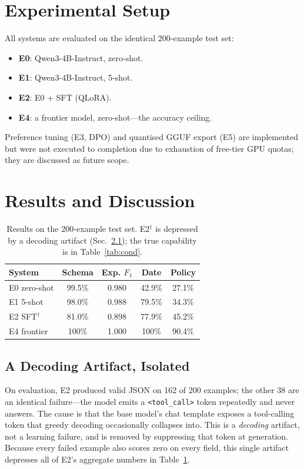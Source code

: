 \documentclass[conference]{IEEEtran}
\begin{document}
\section{Experimental Setup}
All systems are evaluated on the identical 200-example test set:
\begin{itemize}
  \item \textbf{E0}: Qwen3-4B-Instruct, zero-shot.
  \item \textbf{E1}: Qwen3-4B-Instruct, 5-shot.
  \item \textbf{E2}: E0 $+$ SFT (QLoRA).
  \item \textbf{E4}: a frontier model, zero-shot---the accuracy ceiling.
\end{itemize}
Preference tuning (E3, DPO) and quantised GGUF export (E5) are implemented but
were not executed to completion due to exhaustion of free-tier GPU quotas; they
are discussed as future scope.

\section{Results and Discussion}

\begin{table}[t]
\caption{Results on the 200-example test set. E2$^{\dagger}$ is depressed by a
decoding artifact (Sec.~\ref{sec:artifact}); the true capability is in
Table~\ref{tab:cond}.}
\label{tab:main}
\centering
\small
\begin{tabular}{lcccc}
\toprule
System & Schema & Exp. $F_1$ & Date & Policy \\
\midrule
E0 zero-shot        & 99.5\% & 0.980 & 42.9\% & 27.1\% \\
E1 5-shot           & 98.0\% & 0.988 & 79.5\% & 34.3\% \\
E2 SFT$^{\dagger}$  & 81.0\% & 0.898 & 77.9\% & 45.2\% \\
E4 frontier         & 100\%  & 1.000 & 100\%  & 90.4\% \\
\bottomrule
\end{tabular}
\end{table}

\subsection{A Decoding Artifact, Isolated}
\label{sec:artifact}
On evaluation, E2 produced valid JSON on 162 of 200 examples; the other 38 are
an identical failure---the model emits a \texttt{<tool\_call>} token
repeatedly and never answers. The cause is that the base model's chat template
exposes a tool-calling token that greedy decoding occasionally collapses into.
This is a \emph{decoding} artifact, not a learning failure, and is removed by
suppressing that token at generation. Because every failed example also scores
zero on every field, this single artifact depresses all of E2's aggregate
numbers in Table~\ref{tab:main}.
\end{document}
